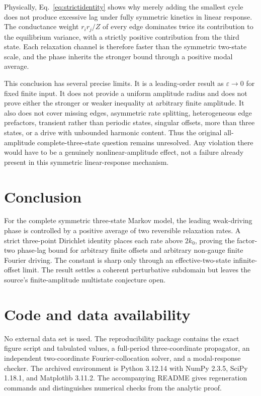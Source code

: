 \documentclass[11pt,a4paper]{article}
\newcommand{\eps}{\varepsilon}
\begin{document}
Physically, Eq.~\eqref{eq:strictidentity} shows why merely adding the smallest cycle does
not produce excessive lag under fully symmetric kinetics in linear response. The
conductance weight $r_ir_j/Z$ of every edge dominates twice its contribution to the
equilibrium variance, with a strictly positive contribution from the third state. Each
relaxation channel is therefore faster than the symmetric two-state scale, and the phase
inherits the stronger bound through a positive modal average.

This conclusion has several precise limits. It is a leading-order result as
$\eps\to0$ for fixed finite input. It does not provide a uniform amplitude radius and
does not prove either the stronger or weaker inequality at arbitrary finite amplitude.
It also does not cover missing edges, asymmetric rate splitting, heterogeneous edge
prefactors, transient rather than periodic states, singular offsets, more than three
states, or a drive with unbounded harmonic content. Thus the original all-amplitude
complete-three-state question remains unresolved. Any violation there would have to be
a genuinely nonlinear-amplitude effect, not a failure already present in this symmetric
linear-response mechanism.

\section{Conclusion}

For the complete symmetric three-state Markov model, the leading weak-driving phase is
controlled by a positive average of two reversible relaxation rates. A strict
three-point Dirichlet identity places each rate above $2k_0$, proving the factor-two
phase-lag bound for arbitrary finite offsets and arbitrary non-gauge finite Fourier
driving. The constant is sharp only through an effective-two-state infinite-offset
limit. The result settles a coherent perturbative subdomain but leaves the source's
finite-amplitude multistate conjecture open.

\section*{Code and data availability}

No external data set is used. The reproducibility package contains the exact figure
script and tabulated values, a full-period three-coordinate propagator, an independent
two-coordinate Fourier-collocation solver, and a modal-response checker. The archived
environment is Python 3.12.14 with NumPy 2.3.5, SciPy 1.18.1, and Matplotlib 3.11.2.
The accompanying README gives regeneration commands and distinguishes numerical checks
from the analytic proof.
\end{document}
